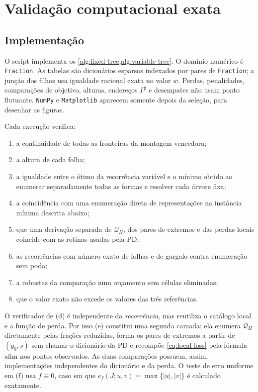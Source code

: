 \section{Validação computacional exata}
\label{sec:numerical}

\subsection{Implementação}

O script
implementa os \cref{alg:fixed-tree,alg:variable-tree}. O domínio numérico é
\texttt{Fraction}. As tabelas são dicionários esparsos indexados
por pares de \texttt{Fraction}; a junção dos filhos usa igualdade racional
exata no valor $w$. Perdas, penalidades, comparações de objetivo, alturas,
endereços $\Gamma^\sharp$ e desempates não usam ponto flutuante.
\texttt{NumPy} e \texttt{Matplotlib} aparecem somente depois da seleção, para
desenhar as figuras.

Cada execução verifica:
\begin{enumerate}[label=(\alph*),leftmargin=2em]
 \item a continuidade de todas as fronteiras da montagem vencedora;
 \item a altura de cada folha;
 \item a igualdade entre o ótimo da recorrência variável e o mínimo obtido ao
 enumerar separadamente todas as formas e resolver cada árvore fixa;
 \item a coincidência com uma enumeração direta de representações na
 instância mínima descrita abaixo;
 \item que uma derivação separada de $\mathcal Q_H$, dos pares de extremos
 e das perdas locais coincide com as rotinas usadas pela PD;
 \item as recorrências com número exato de folhas e de gargalo contra
 enumeração sem poda;
 \item a robustez da comparação num orçamento sem células eliminadas;
 \item que o valor exato não excede os valores das três referências.
\end{enumerate}

O verificador de (d) é independente da \emph{recorrência}, mas reutiliza o
catálogo local e a função de perda. Por isso (e) constitui uma segunda camada:
ela enumera $\mathcal Q_H$ diretamente pelas frações reduzidas, forma os pares
de extremos a partir de $(y_0,s)$ sem chamar o dicionário da PD e recompõe
\eqref{eq:local-loss} pela fórmula afim nos pontos observados. As duas
comparações possuem, assim, implementações independentes do dicionário e da
perda. O teste de erro uniforme em (f) usa $f\equiv0$, caso em que
$e_f(J;u,v)=\max\{|u|,|v|\}$ é calculado exatamente.

